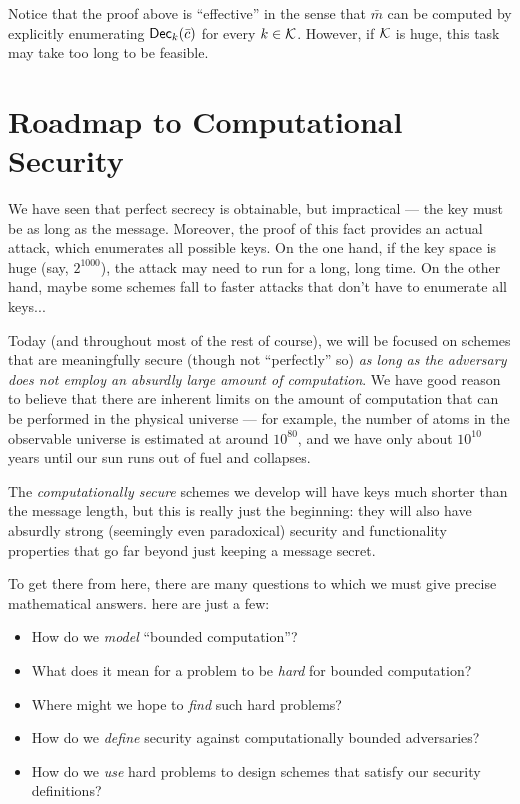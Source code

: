 \documentclass[11pt]{article}
\begin{document}
Notice that the proof above is ``effective'' in the sense that
$\bar{m}$ can be computed by explicitly enumerating
$\mathsf{Dec}_{k}(\bar{c})$ for every $k \in \mathcal{K}$.  However, if
$\mathcal{K}$ is huge, this task may take too long to be feasible.

\section{Roadmap to Computational Security}
\label{sec:roadmap-comp-sec}

We have seen that perfect secrecy is obtainable, but impractical ---
the key must be as long as the message.  Moreover, the proof of this
fact provides an actual attack, which enumerates all possible keys.
On the one hand, if the key space is huge (say, $2^{1000}$), the
attack may need to run for a long, long time.  On the other hand,
maybe some schemes fall to faster attacks that don't have to
enumerate all keys...

Today (and throughout most of the rest of course), we will be focused
on schemes that are meaningfully secure (though not ``perfectly'' so)
\emph{as long as the adversary does not employ an absurdly large
  amount of computation}.  We have good reason to believe that there
are inherent limits on the amount of computation that can be performed
in the physical universe --- for example, the number of atoms in the
observable universe is estimated at around $10^{80}$, and we have only
about $10^{10}$ years until our sun runs out of fuel and collapses.

The \emph{computationally secure} schemes we develop will have keys
much shorter than the message length, but this is really just the
beginning: they will also have absurdly strong (seemingly even
paradoxical) security and functionality properties that go far beyond
just keeping a message secret.

To get there from here, there are many questions to which we must give
precise mathematical answers.  here are just a few:
\begin{itemize}[itemsep=0pt]
\item How do we \emph{model} ``bounded computation''?
\item What does it mean for a problem to be \emph{hard} for bounded
  computation?
\item Where might we hope to \emph{find} such hard problems?
\item How do we \emph{define} security against computationally bounded
  adversaries?
\item How do we \emph{use} hard problems to design schemes that
  satisfy our security definitions?
\end{itemize}
\end{document}
